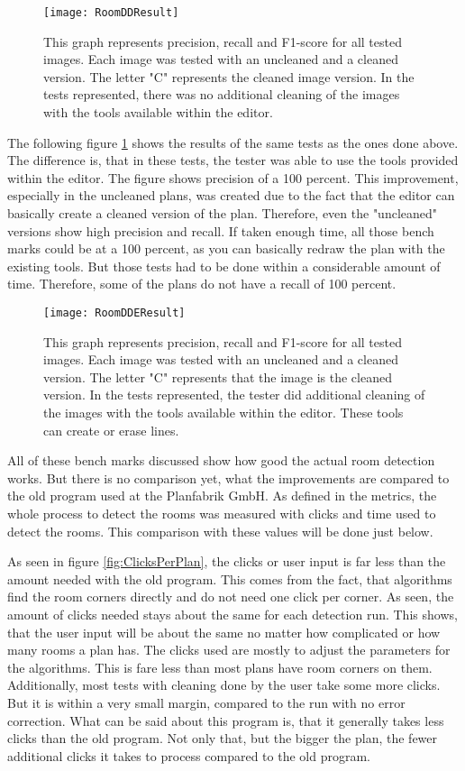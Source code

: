 \begin{figure}[H]
	\centering
	\texttt{[image: RoomDDResult]}
	\caption{This graph represents precision, recall and F1-score for all tested images. Each image was tested with an uncleaned and a cleaned version. The letter "C" represents the cleaned image version. In the tests represented, there was no additional cleaning of the images with the tools available within the editor. }
	\label{fig:RoomDDResult}
\end{figure}

The following figure \ref{fig:RoomDDResult} shows the results of the same tests as the ones done above. The difference is, that in these tests, the tester was able to use the tools provided within the editor. The figure shows precision of a 100 percent. This improvement, especially in the uncleaned plans, was created due to the fact that the editor can basically create a cleaned version of the plan. Therefore, even the "uncleaned" versions show high precision and recall. If taken enough time, all those bench marks could be at a 100 percent, as you can basically redraw the plan with the existing tools. But those tests had to be done within a considerable amount of time. Therefore, some of the plans do not have a recall of 100 percent.

\begin{figure}[H]
	\centering
	\texttt{[image: RoomDDEResult]}
	\caption{This graph represents precision, recall and F1-score for all tested images. Each image was tested with an uncleaned and a cleaned version. The letter "C" represents that the image is the cleaned version. In the tests represented, the tester did additional cleaning of the images with the tools available within the editor. These tools can create or erase lines. }
	\label{fig:RoomDDEResult}
\end{figure}

All of these bench marks discussed show how good the actual room detection works. But there is no comparison yet, what the improvements are compared to the old program used at the Planfabrik GmbH. As defined in the metrics, the whole process to detect the rooms was measured with clicks and time used to detect the rooms. This comparison with these values will be done just below.

As seen in figure \ref{fig:ClicksPerPlan}, the clicks or user input is far less than the amount needed with the old program. This comes from the fact, that algorithms find the room corners directly and do not need one click per corner. As seen, the amount of clicks needed stays about the same for each detection run. This shows, that the user input will be about the same no matter how complicated or how many rooms a plan has. The clicks used are mostly to adjust the parameters for the algorithms. This is fare less than most plans have room corners on them. Additionally, most tests with cleaning done by the user take some more clicks. But it is within a very small margin, compared to the run with no error correction. What can be said about this program is, that it generally takes less clicks than the old program. Not only that, but the bigger the plan, the fewer additional clicks it takes to process compared to the old program. 

